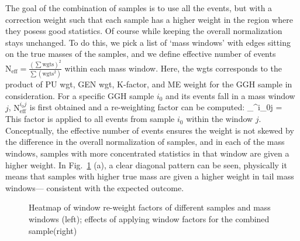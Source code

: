 The goal of the combination of samples is to use all the events, but with a correction weight
such that each sample has a higher weight in the region where they posess good statistics. Of
course while keeping the overall normalization stays unchanged. To do this, we pick a list of
`mass windows' with edges sitting on the true masses of the samples, and we define effective
number of events $\mathrm{N}_\mathrm{eff} = \frac{(\sum\mathrm{wgts})^2}{\sum(\mathrm{wgts}^2)}$
within each mass window. Here, the wgts corresponds to the product of PU wgt, GEN wgt, K-factor, and ME weight for
the GGH sample in consideration. For a specific GGH sample $i_0$ and its events fall in a mass 
window $j$, $\mathrm{N}_\mathrm{eff}^{i_0j}$ is first obtained and a re-weighting factor can be computed:
\be
{}_^{i_0j} = 
\ee
This factor is applied to all events from sample $i_0$ within the window $j$. Conceptually,
the effective number of events ensures the weight is not skewed by the difference in the overall
normalization of samples, and in each of the mass windows, samples with more concentrated
statistics in that window are given a higher weight. In Fig.~\ref{fig:window_wgt_matrix} (a), a
clear diagonal pattern can be seen, physically it means that samples with higher true 
mass are given a higher weight in tail mass windows--- consistent with the expected outcome.
\begin{figure}[htb]
    \begin{center}
    \end{center}
    \caption{Heatmap of window re-weight factors of different samples and mass windows (left);
    effects of applying window factors for the combined sample(right)}
    \label{fig:window_wgt_matrix}
\end{figure}

